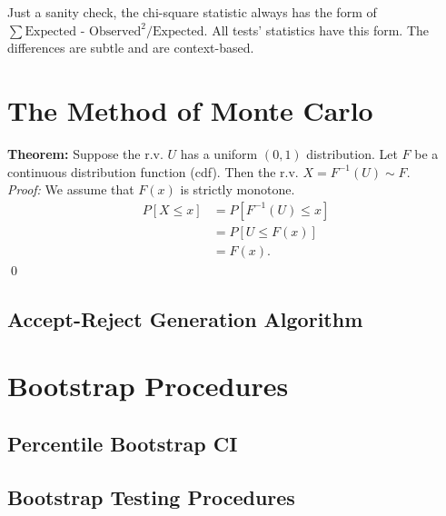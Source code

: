 \documentclass{book}
\theoremstyle{definition}
\newcommand{\nn}{\nonumber}
\begin{document}
Just a sanity check, the chi-square statistic always has the form of $\sum \text{Expected - Observed}^2/\text{Expected}$. All tests' statistics have this form. The differences are subtle and are context-based. 


\section{The Method of Monte Carlo}

\noindent \textbf{Theorem:} Suppose the r.v. $U$ has a uniform $(0,1)$ distribution. Let $F$ be a continuous distribution function (cdf). Then the r.v. $X = F^{-1}(U) \sim F$.\\

\noindent \textit{Proof:} We assume that $F(x)$ is strictly monotone. 
\begin{align}
P[X\leq x] &= P[F^{-1}(U) \leq x]\nn\\
&= P[U \leq F(x)]\nn\\
&= F(x).
\end{align} \qed






\subsection{Accept-Reject Generation Algorithm}

\section{Bootstrap Procedures}

\subsection{Percentile Bootstrap CI}
\subsection{Bootstrap Testing Procedures}
\end{document}
